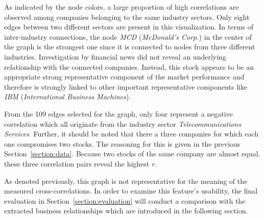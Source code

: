 As indicated by the node colors, a large proportion of high correlations are observed among companies belonging to the same industry sectors. Only eight edges between two different sectors are present in this visualization. In terms of inter-industry connections, the node \emph{MCD} (\emph{McDonald's Corp.}) in the center of the graph is the strongest one since it is connected to nodes from three different industries. Investigation by financial news did not reveal an underlying relationship with the connected companies. Instead, this stock appears to be an appropriate strong representative component of the market performance and therefore is strongly linked to other important representative components like \emph{IBM} (\emph{International Business Machines}).

From the 109 edges selected for the graph, only four represent a negative correlation which all originate from the industry sector \emph{Telecommunications Services}. Further, it should be noted that there a three companies for which each one compromises two stocks. The reasoning for this is given in the previous Section~\ref{section:data}. Because two stocks of the same company are almost equal. these three correlation pairs reveal the highest $r$.

As denoted previously, this graph is not representative for the meaning of the measured cross-correlations. In order to examine this feature's usability, the final evaluation in Section~\ref{section:evaluation} will conduct a comparison with the extracted business relationships which are introduced in the following section.








